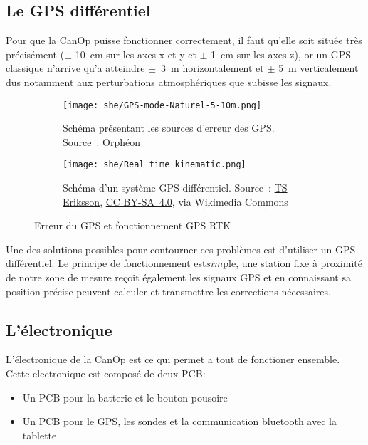 \subsection{Le GPS différentiel}
\label{ssec_Gps_differenciel}
Pour que la CanOp puisse fonctionner correctement, il faut qu'elle soit située très précisément ($\pm$ 10~cm sur les axes x et y et $\pm$ 1~cm sur les axes z), or un GPS classique n'arrive qu’a atteindre $\pm$~3~m horizontalement et $\pm$ 5~m verticalement \cite{GPS_accuracy} dus notamment aux perturbations atmosphériques que subisse les signaux. %
\begin{figure}

    \begin{subfigure}[t]{0.5\textwidth}
        \centering
        \texttt{[image: she/GPS-mode-Naturel-5-10m.png]}

        \caption[Source d'erreur des GPS]{Schéma présentant les sources d'erreur des GPS. Source~: Orphéon}
        \label{fig_GPS_error_source}
    \end{subfigure}
    \begin{subfigure}[t]{0.5\textwidth}
        \centering
        \texttt{[image: she/Real\_time\_kinematic.png]}

        \caption[Shema d'un systeme GPS differenciel]{Schéma d'un système GPS différentiel. Source~: \href{https://commons.wikimedia.org/wiki/File:Real_time_kinematic.svg}{TS Eriksson}, \href{https://creativecommons.org/licenses/by-sa/4.0}{CC BY-SA~4.0}, via Wikimedia Commons}
        \label{fig_RTK}
    \end{subfigure}
    \caption{Erreur du GPS et fonctionnement GPS RTK}
\end{figure}

Une des solutions possibles pour contourner ces problèmes est d'utiliser un GPS différentiel. Le principe de fonctionnement est$ sim$ple, une station fixe à proximité de notre zone de mesure reçoit également les signaux GPS et en connaissant sa position précise peuvent calculer et transmettre les corrections nécessaires. \cite{site:GPS_diff} %

\subsection{L'électronique}

L'électronique de la CanOp est ce qui permet a tout de fonctioner ensemble. Cette electronique est composé de deux PCB:
\begin{itemize}
    \item Un PCB pour la batterie et le bouton pousoire
    \item Un PCB pour le GPS, les sondes et la communication bluetooth avec la tablette
\end{itemize}

